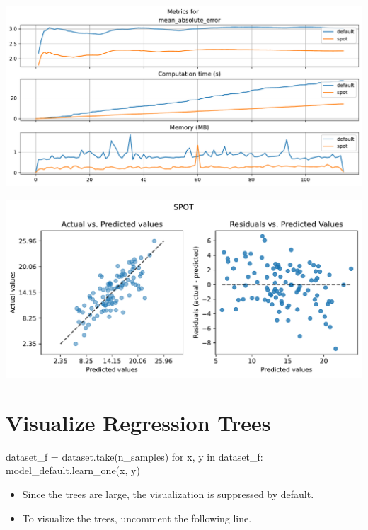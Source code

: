 \documentclass[
  letterpaper,
  DIV=11,
  numbers=noendperiod]{scrreprt}
\newenvironment{Shaded}{\begin{snugshade}}{\end{snugshade}}
\newcommand{\ControlFlowTok}[1]{\textcolor[rgb]{0.00,0.23,0.31}{#1}}
\newcommand{\KeywordTok}[1]{\textcolor[rgb]{0.00,0.23,0.31}{#1}}
\newcommand{\NormalTok}[1]{\textcolor[rgb]{0.00,0.23,0.31}{#1}}
\newcommand{\OperatorTok}[1]{\textcolor[rgb]{0.37,0.37,0.37}{#1}}
\providecommand{\tightlist}{%
  \setlength{\itemsep}{0pt}\setlength{\parskip}{0pt}}\usepackage{longtable,booktabs,array}
\begin{document}
\includegraphics{024_spot_hpt_river_friedman_hatr_files/figure-pdf/cell-34-output-1.pdf}

\includegraphics{024_spot_hpt_river_friedman_hatr_files/figure-pdf/cell-34-output-2.pdf}

\section{Visualize Regression Trees}\label{visualize-regression-trees}

\begin{Shaded}
\begin{Highlighting}[]
\NormalTok{dataset\_f }\OperatorTok{=}\NormalTok{ dataset.take(n\_samples)}
\ControlFlowTok{for}\NormalTok{ x, y }\KeywordTok{in}\NormalTok{ dataset\_f:}
\NormalTok{    model\_default.learn\_one(x, y)}
\end{Highlighting}
\end{Shaded}

\begin{tcolorbox}[enhanced jigsaw, coltitle=black, bottomrule=.15mm, breakable, toprule=.15mm, colframe=quarto-callout-caution-color-frame, title=\textcolor{quarto-callout-caution-color}{\faFire}\hspace{0.5em}{Caution: Large Trees}, colbacktitle=quarto-callout-caution-color!10!white, opacityback=0, left=2mm, leftrule=.75mm, colback=white, rightrule=.15mm, bottomtitle=1mm, toptitle=1mm, titlerule=0mm, arc=.35mm, opacitybacktitle=0.6]

\begin{itemize}
\tightlist
\item
  Since the trees are large, the visualization is suppressed by default.
\item
  To visualize the trees, uncomment the following line.
\end{itemize}

\end{tcolorbox}
\end{document}
